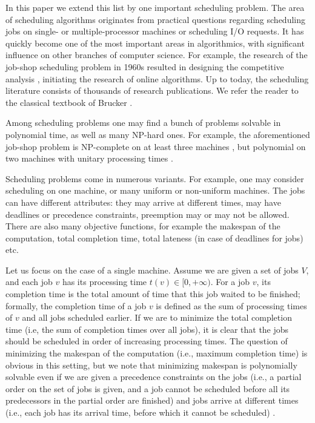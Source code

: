 \documentclass{article}
\theoremstyle{definition}
\begin{document}
In this paper we extend this list by one important scheduling problem.
The area of scheduling algorithms originates from practical questions regarding scheduling jobs on single- or multiple-processor
machines or scheduling I/O requests. It has quickly become one of the most important areas in algorithmics, with significant influence on other branches of computer science.
For example, the research of the job-shop scheduling problem in 1960s resulted
in designing the competitive analysis \cite{graham:jobshop}, initiating the research of
online algorithms.
Up to today, the scheduling literature consists of thousands of research publications.
We refer the reader to the classical textbook of Brucker \cite{sched:book}.

Among scheduling problems one may find a bunch of problems solvable in polynomial time, as well as many NP-hard ones.
For example, the aforementioned job-shop problem is NP-complete on at least three machines \cite{job-shop:3},
but polynomial on two machines with unitary processing times \cite{job-shop:2}.

Scheduling problems come in numerous variants. For example, one may consider
scheduling on one machine, or many uniform or non-uniform machines.
The jobs can have different attributes: they may arrive at different times,
may have deadlines or precedence constraints, preemption may or may not be allowed.
There are also many objective functions, for example the makespan of the computation,
total completion time, total lateness (in case of deadlines for jobs) etc.

Let us focus on the case of a single machine. Assume we are given a set of jobs $V$,
and each job $v$ has its processing time $t(v) \in [0,+\infty)$.
For a job $v$, its completion time is the total amount of time that this job waited
to be finished; formally, the completion time of a job $v$ is defined as the sum
of processing times of $v$ and all jobs scheduled earlier.
If we are to minimize the total completion time (i.e, the sum of completion times
over all jobs), it is clear that the jobs should be scheduled in order of increasing
processing times.
The question of minimizing the makespan of the computation (i.e., maximum completion time)
is obvious in this setting, but we note that minimizing makespan is polynomially solvable even
if we are given a precedence constraints on the jobs (i.e., a partial order on the set of jobs
is given, and a job cannot be scheduled before all its predecessors in the partial order
are finished) and jobs arrive at different times (i.e., each job has its arrival time,
  before which it cannot be scheduled) \cite{lawler:sched}.
\end{document}
